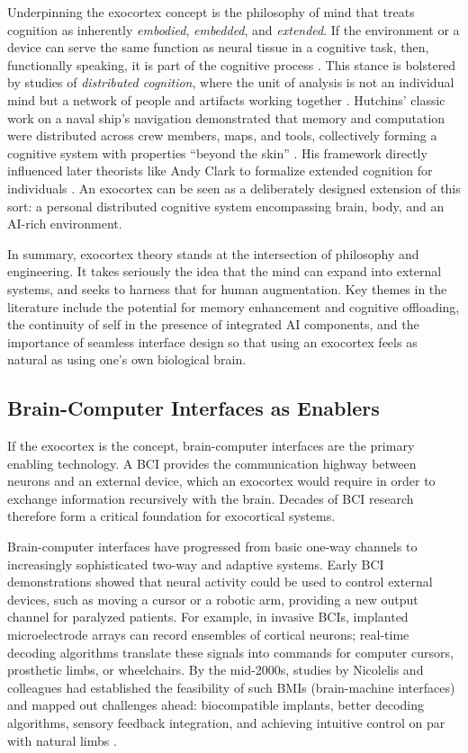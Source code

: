 \documentclass[11pt]{article}
\newcommand{\quotes}[1]{``#1''}
\begin{document}
Underpinning the exocortex concept is the philosophy of mind that treats cognition as inherently \textit{embodied}, \textit{embedded}, and \textit{extended}. If the environment or a device can serve the same function as neural tissue in a cognitive task, then, functionally speaking, it is part of the cognitive process \cite{Clark1998}. This stance is bolstered by studies of \textit{distributed cognition}, where the unit of analysis is not an individual mind but a network of people and artifacts working together \cite{Hollan2000}. Hutchins' classic work on a naval ship's navigation demonstrated that memory and computation were distributed across crew members, maps, and tools, collectively forming a cognitive system with properties \quotes{beyond the skin} \cite{Hollan2000}. His framework directly influenced later theorists like Andy Clark to formalize extended cognition for individuals \cite{Hollan2000}. An exocortex can be seen as a deliberately designed extension of this sort: a personal distributed cognitive system encompassing brain, body, and an AI-rich environment.

In summary, exocortex theory stands at the intersection of philosophy and engineering. It takes seriously the idea that the mind can expand into external systems, and seeks to harness that for human augmentation. Key themes in the literature include the potential for memory enhancement and cognitive offloading, the continuity of self in the presence of integrated AI components, and the importance of seamless interface design so that using an exocortex feels as natural as using one's own biological brain.

\subsection{Brain-Computer Interfaces as Enablers}
If the exocortex is the concept, brain-computer interfaces are the primary enabling technology. A BCI provides the communication highway between neurons and an external device, which an exocortex would require in order to exchange information recursively with the brain. Decades of BCI research therefore form a critical foundation for exocortical systems.

Brain-computer interfaces have progressed from basic one-way channels to increasingly sophisticated two-way and adaptive systems. Early BCI demonstrations showed that neural activity could be used to control external devices, such as moving a cursor or a robotic arm, providing a new output channel for paralyzed patients. For example, in invasive BCIs, implanted microelectrode arrays can record ensembles of cortical neurons; real-time decoding algorithms translate these signals into commands for computer cursors, prosthetic limbs, or wheelchairs. By the mid-2000s, studies by Nicolelis and colleagues had established the feasibility of such BMIs (brain-machine interfaces) and mapped out challenges ahead: biocompatible implants, better decoding algorithms, sensory feedback integration, and achieving intuitive control on par with natural limbs \cite{Lebedev2006}.
\end{document}
